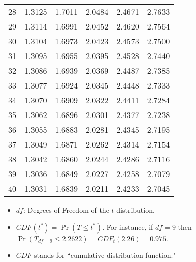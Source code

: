 \documentclass[letterpage]{article}
\begin{document}
\begin{table}[ht!]
\begin{tabular}{|p{}|p{}|p{}|p{}|p{}|p{}|}
28 & 1.3125 & 1.7011 & 2.0484 & 2.4671 & 2.7633 \\ \cline{1-1} \cline{2-2} \cline{3-3} \cline{4-4} \cline{5-5} \cline{6-6}
29 & 1.3114 & 1.6991 & 2.0452 & 2.4620 & 2.7564 \\ \cline{1-1} \cline{2-2} \cline{3-3} \cline{4-4} \cline{5-5} \cline{6-6}
30 & 1.3104 & 1.6973 & 2.0423 & 2.4573 & 2.7500 \\ \cline{1-1} \cline{2-2} \cline{3-3} \cline{4-4} \cline{5-5} \cline{6-6}
31 & 1.3095 & 1.6955 & 2.0395 & 2.4528 & 2.7440 \\ \cline{1-1} \cline{2-2} \cline{3-3} \cline{4-4} \cline{5-5} \cline{6-6}
32 & 1.3086 & 1.6939 & 2.0369 & 2.4487 & 2.7385 \\ \cline{1-1} \cline{2-2} \cline{3-3} \cline{4-4} \cline{5-5} \cline{6-6}
33 & 1.3077 & 1.6924 & 2.0345 & 2.4448 & 2.7333 \\ \cline{1-1} \cline{2-2} \cline{3-3} \cline{4-4} \cline{5-5} \cline{6-6}
34 & 1.3070 & 1.6909 & 2.0322 & 2.4411 & 2.7284 \\ \cline{1-1} \cline{2-2} \cline{3-3} \cline{4-4} \cline{5-5} \cline{6-6}
35 & 1.3062 & 1.6896 & 2.0301 & 2.4377 & 2.7238 \\ \cline{1-1} \cline{2-2} \cline{3-3} \cline{4-4} \cline{5-5} \cline{6-6}
36 & 1.3055 & 1.6883 & 2.0281 & 2.4345 & 2.7195 \\ \cline{1-1} \cline{2-2} \cline{3-3} \cline{4-4} \cline{5-5} \cline{6-6}
37 & 1.3049 & 1.6871 & 2.0262 & 2.4314 & 2.7154 \\ \cline{1-1} \cline{2-2} \cline{3-3} \cline{4-4} \cline{5-5} \cline{6-6}
38 & 1.3042 & 1.6860 & 2.0244 & 2.4286 & 2.7116 \\ \cline{1-1} \cline{2-2} \cline{3-3} \cline{4-4} \cline{5-5} \cline{6-6}
39 & 1.3036 & 1.6849 & 2.0227 & 2.4258 & 2.7079 \\ \cline{1-1} \cline{2-2} \cline{3-3} \cline{4-4} \cline{5-5} \cline{6-6}
40 & 1.3031 & 1.6839 & 2.0211 & 2.4233 & 2.7045 \\ \cline{1-1} \cline{2-2} \cline{3-3} \cline{4-4} \cline{5-5} \cline{6-6}
\end{tabular}
\end{table}
\begin{itemize}
    \item $df$: Degrees of Freedom of the $t$ distribution.
    \item $CDF(t^*)=\Pr(T\leq t^*)$. For instance, if $df=9$ then $\Pr(T_{df=9}\leq 2.2622)=CDF_t(2.26)=0.975$.
    \item $CDF$ stands for ``cumulative distribution function."
\end{itemize}
\end{document}
